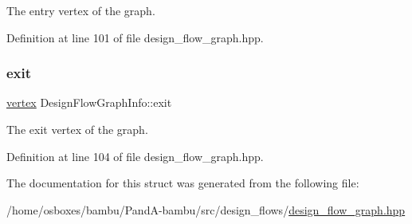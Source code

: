The entry vertex of the graph. 



Definition at line 101 of file design\+\_\+flow\+\_\+graph.\+hpp.

\mbox{\label{structDesignFlowGraphInfo_ae55b80adf8deb7f3c11866c37607b262}} 
\subsubsection{\texorpdfstring{exit}{exit}}
{\footnotesize\ttfamily \hyperlink{graph_8hpp_abefdcf0544e601805af44eca032cca14}{vertex} Design\+Flow\+Graph\+Info\+::exit}



The exit vertex of the graph. 



Definition at line 104 of file design\+\_\+flow\+\_\+graph.\+hpp.



The documentation for this struct was generated from the following file\+:\begin{DoxyCompactItemize}
\item 
/home/osboxes/bambu/\+Pand\+A-\/bambu/src/design\+\_\+flows/\hyperlink{design__flow__graph_8hpp}{design\+\_\+flow\+\_\+graph.\+hpp}\end{DoxyCompactItemize}
